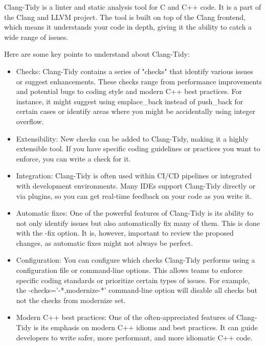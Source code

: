 


Clang-Tidy is a linter and static analysis tool for C and C++ code. It is a part of the Clang and LLVM project. The tool is built on top of the Clang frontend, which means it understands your code in depth, giving it the ability to catch a wide range of issues.

Here are some key points to understand about Clang-Tidy:

\begin{itemize}
\item
Checks: Clang-Tidy contains a series of "checks" that identify various issues or suggest enhancements. These checks range from performance improvements and potential bugs to coding style and modern C++ best practices. For instance, it might suggest using emplace\_back instead of push\_back for certain cases or identify areas where you might be accidentally using integer overflow.

\item
Extensibility: New checks can be added to Clang-Tidy, making it a highly extensible tool. If you have specific coding guidelines or practices you want to enforce, you can write a check for it.

\item
Integration: Clang-Tidy is often used within CI/CD pipelines or integrated with development environments. Many IDEs support Clang-Tidy directly or via plugins, so you can get real-time feedback on your code as you write it.

\item
Automatic fixes: One of the powerful features of Clang-Tidy is its ability to not only identify issues but also automatically fix many of them. This is done with the -fix option. It is, however, important to review the proposed changes, as automatic fixes might not always be perfect.

\item
Configuration: You can configure which checks Clang-Tidy performs using a configuration file or command-line options. This allows teams to enforce specific coding standards or prioritize certain types of issues. For example, the -checks='-*,modernize-*' command-line option will disable all checks but not the checks from modernize set.

\item
Modern C++ best practices: One of the often-appreciated features of Clang-Tidy is its emphasis on modern C++ idioms and best practices. It can guide developers to write safer, more performant, and more idiomatic C++ code.
\end{itemize}

